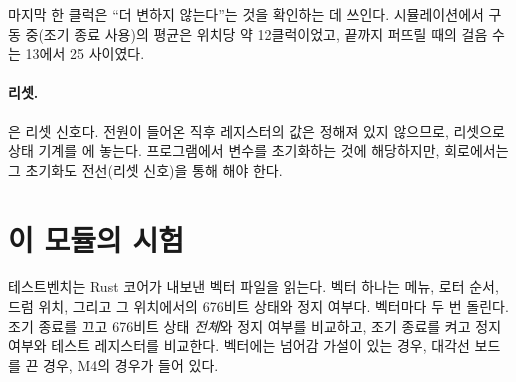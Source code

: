 마지막 한 클럭은 ``더 변하지 않는다''는 것을 확인하는 데 쓰인다. 시뮬레이션에서 구동 중(조기 종료 사용)의
평균은 위치당 약 12클럭이었고, 끝까지 퍼뜨릴 때의 걸음 수는 13에서 25 사이였다.

\paragraph{리셋.} 은 리셋 신호다. 전원이 들어온 직후 레지스터의 값은 정해져 있지 않으므로,
리셋으로 상태 기계를 에 놓는다. 프로그램에서 변수를 초기화하는 것에 해당하지만, 회로에서는 그
초기화도 전선(리셋 신호)을 통해 해야 한다.

\section{이 모듈의 시험}

테스트벤치는 Rust 코어가 내보낸 벡터 파일을 읽는다. 벡터 하나는 메뉴, 로터 순서, 드럼 위치, 그리고 그
위치에서의 676비트 상태와 정지 여부다. 벡터마다 두 번 돌린다. 조기 종료를 끄고 676비트 상태 \emph{전체}와
정지 여부를 비교하고, 조기 종료를 켜고 정지 여부와 테스트 레지스터를 비교한다. 벡터에는 넘어감 가설이 있는
경우, 대각선 보드를 끈 경우, M4의 경우가 들어 있다.
